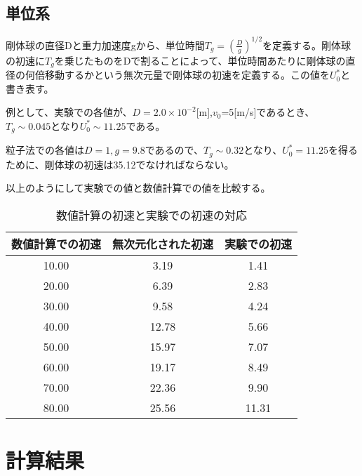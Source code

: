 \documentclass[]{jsarticle}
\begin{document}
\subsection{単位系}
剛体球の直径Dと重力加速度gから、単位時間$T_g=\left(\frac{D}{g}\right)^{1/2}$を定義する。剛体球の初速に$T_g$を乗じたものをDで割ることによって、単位時間あたりに剛体球の直径の何倍移動するかという無次元量で剛体球の初速を定義する。この値を$U_0^*$と書き表す。

例として、実験での各値が、$D=2.0\times10^{-2}$[m],$v_0$=5[m/s]であるとき、$T_g\sim 0.045$となり$U_0^*\sim11.25$である。

粒子法での各値は$D=1, g=9.8$であるので、$T_g\sim 0.32$となり、$U_0^*=11.25$を得るために、剛体球の初速は35.12でなければならない。

以上のようにして実験での値と数値計算での値を比較する。
\begin{table}[h]
  \caption{数値計算の初速と実験での初速の対応}
  \label{tab:velocity_non_dim}
  \begin{center}
    \begin{tabular}{|c|c|c|}\hline
      数値計算での初速&無次元化された初速&実験での初速 \\ \hline
      10.00 & 3.19 & 1.41 \\ \hline
      20.00 & 6.39 & 2.83 \\ \hline
      30.00 & 9.58 & 4.24 \\ \hline
      40.00 & 12.78 & 5.66 \\ \hline
      50.00 & 15.97 & 7.07 \\ \hline
      60.00 & 19.17 & 8.49 \\ \hline
      70.00 & 22.36 & 9.90 \\ \hline
      80.00 & 25.56 & 11.31 \\ \hline
    \end{tabular}
  \end{center}
\end{table}



\newpage
\section{計算結果}
\end{document}
